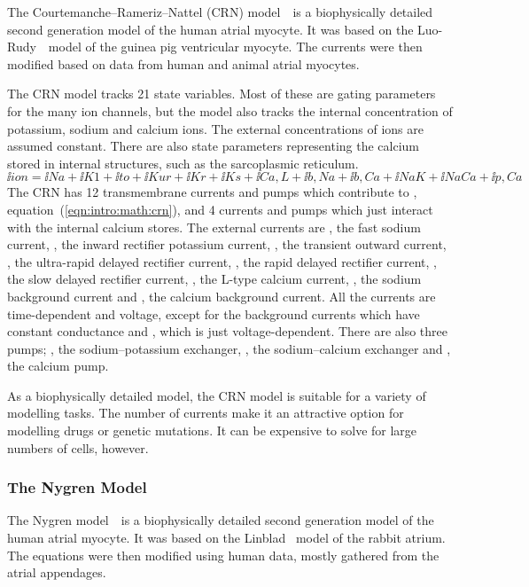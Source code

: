 The Courtemanche--Rameriz--Nattel (CRN) model~\cite{CRN98}\ is a biophysically
detailed second generation model of the human atrial myocyte.
It was based on the Luo-Rudy~\cite{Luo1994}\ model of the guinea pig ventricular
myocyte.
The currents were then modified based on data from human and animal atrial
myocytes.

The CRN model tracks 21 state variables.
Most of these are gating parameters for the many ion channels, but the model
also tracks the internal concentration of potassium, sodium and calcium ions.
The external concentrations of ions are assumed constant.
There are also state parameters representing the calcium stored in internal
structures, such as the sarcoplasmic reticulum.
\begin{equation}
\label{eqn:intro:math:crn}
\ii{ion} = \ii{Na} + \ii{K1} + \ii{to} + \ii{Kur} + \ii{Kr} + \ii{Ks} +
\ii{Ca,L} + \ii{b,Na} + \ii{b,Ca} + \ii{NaK} + \ii{NaCa} + \ii{p,Ca}
\end{equation}
The CRN has 12 transmembrane currents and pumps which contribute to ,
equation~(\ref{eqn:intro:math:crn}), and 4 currents and
pumps which just interact with the internal calcium stores.
The external currents are , the fast sodium current, , the inward
rectifier potassium current, , the transient outward current, , the
ultra-rapid delayed rectifier current, , the rapid delayed rectifier
current, , the slow delayed rectifier current, , the L-type
calcium current, , the sodium background current and , the
calcium background current.
All the currents are time-dependent and voltage, except for the background currents which
have constant conductance and , which is just voltage-dependent.
There are also three pumps; , the sodium--potassium exchanger,
, the sodium--calcium exchanger and , the calcium pump.

As a biophysically detailed model, the CRN model is suitable for a variety of
modelling tasks.
The number of currents make it an attractive option for modelling drugs or
genetic mutations.
It can be expensive to solve for large numbers of cells, however.

\subsubsection{The Nygren Model}

The Nygren model~\cite{Nygren1998}\ is a biophysically detailed second
generation model of the human atrial myocyte.
It was based on the Linblad~\cite{Lindblad1996} model of the rabbit atrium.
The equations were then modified using human data, mostly gathered from the
atrial appendages.

